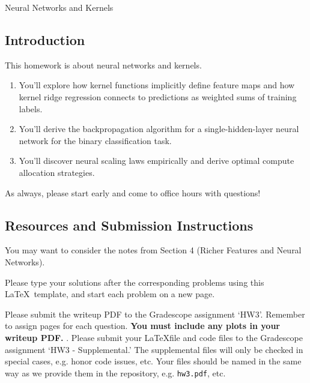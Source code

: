 \documentclass[submit]{harvardml}
\begin{document}
\begin{center}
  {\Large Neural Networks and Kernels}\\
\end{center}

\subsection*{Introduction}

This homework is about neural networks and kernels.

\begin{enumerate}
  \item You'll explore how kernel functions implicitly define feature maps and how kernel ridge regression connects to predictions as weighted sums of training labels.
  \item You'll derive the backpropagation algorithm for a single-hidden-layer neural network for the binary classification task.
  \item You'll discover neural scaling laws empirically and derive optimal compute allocation strategies.
\end{enumerate}

As always, please start early and come to office hours with questions!

\subsection*{Resources and Submission Instructions}
You may want to consider the notes from Section 4 (Richer Features and Neural Networks).

Please type your solutions after the corresponding problems using this \LaTeX\ template, and start each problem on a new page.

Please submit the writeup PDF to the Gradescope assignment `HW3'. Remember to assign pages for each question.  \textbf{You must include any plots in your writeup PDF. }. Please submit your \LaTeX file and code files to the Gradescope assignment `HW3 - Supplemental.' The supplemental files will only be checked in special cases, e.g. honor code issues, etc. Your files should be named in the same way as we provide them in the repository, e.g. \texttt{hw3.pdf}, etc.

\newpage

\end{document}
